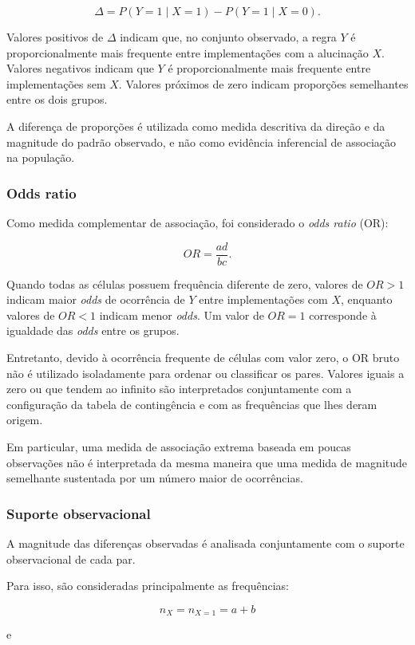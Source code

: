 \[
\Delta =
P(Y=1\mid X=1)
-
P(Y=1\mid X=0).
\]

Valores positivos de $\Delta$ indicam que, no conjunto observado, a regra $Y$ é proporcionalmente mais frequente entre implementações com a alucinação $X$. Valores negativos indicam que $Y$ é proporcionalmente mais frequente entre implementações sem $X$. Valores próximos de zero indicam proporções semelhantes entre os dois grupos.

A diferença de proporções é utilizada como medida descritiva da direção e da magnitude do padrão observado, e não como evidência inferencial de associação na população.

\subsubsection{Odds ratio}

Como medida complementar de associação, foi considerado o \textit{odds ratio} (OR):

\[
OR=\frac{ad}{bc}.
\]

Quando todas as células possuem frequência diferente de zero, valores de $OR>1$ indicam maior \textit{odds} de ocorrência de $Y$ entre implementações com $X$, enquanto valores de $OR<1$ indicam menor \textit{odds}. Um valor de $OR=1$ corresponde à igualdade das \textit{odds} entre os grupos.

Entretanto, devido à ocorrência frequente de células com valor zero, o OR bruto não é utilizado isoladamente para ordenar ou classificar os pares. Valores iguais a zero ou que tendem ao infinito são interpretados conjuntamente com a configuração da tabela de contingência e com as frequências que lhes deram origem.

Em particular, uma medida de associação extrema baseada em poucas observações não é interpretada da mesma maneira que uma medida de magnitude semelhante sustentada por um número maior de ocorrências.

\subsubsection{Suporte observacional}

A magnitude das diferenças observadas é analisada conjuntamente com o suporte observacional de cada par.

Para isso, são consideradas principalmente as frequências:

\[
n_X=n_{X=1}=a+b
\]

e

